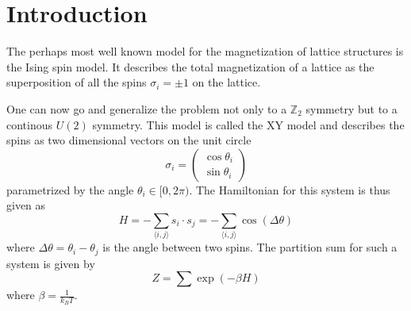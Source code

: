 \section{Introduction}
The perhaps most well known model for the magnetization of lattice structures is the Ising spin model. It describes the total magnetization of a lattice as the superposition of all the spins $\sigma_i = \pm 1$ on the lattice.

One can now go and generalize the problem not only to a $\mathbb{Z}_2$ symmetry but to a continous $U(2)$ symmetry. This model is called the XY model and describes the spins as two dimensional vectors on the unit circle
\begin{equation}\label{eq:hamiltonian}
	\sigma_i = \begin{pmatrix}
		\cos{\theta_i} \\ \sin{\theta_i}
	\end{pmatrix}
\end{equation}
parametrized by the angle $\theta_i \in [0,2\pi)$. The Hamiltonian for this system is thus given as
\begin{equation}\label{eq:partition}
	H = - \sum_{\langle i,j \rangle}{s_i \cdot s_j} = - \sum_{\langle i,j \rangle}{\cos{(\Delta \theta)}}
\end{equation}
where $\Delta \theta = \theta_i - \theta_j$ is the angle between two spins. The partition sum for such a system is given by
\begin{equation}
	Z = \sum{\exp{(-\beta H)}}
\end{equation}
where $\beta = \frac{1}{k_B T}$.